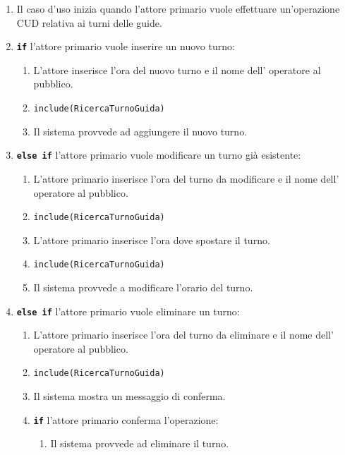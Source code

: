 \documentclass{article}
\begin{document}
		\begin{enumerate}[itemsep=8pt,parsep=0pt]
		
		\item 
		Il caso d'uso inizia quando l'attore primario vuole effettuare un’operazione CUD relativa ai turni delle guide.


		\item \texttt{\textbf{if}} l'attore primario vuole inserire un nuovo turno:
			\begin{enumerate}	[leftmargin=28pt]
			    \item L'attore inserisce l'ora del nuovo turno e il nome dell' operatore al pubblico.
				\item \texttt{{include(RicercaTurnoGuida)}}
				\item  Il sistema provvede ad aggiungere il nuovo turno.
  			\end{enumerate}	


		\item \texttt{\textbf{else if}} l’attore primario vuole modificare un turno già esistente:
			\begin{enumerate}[leftmargin=28pt]
			    \item L'attore primario inserisce l'ora del turno da modificare e il nome dell' operatore al pubblico.
				\item  \texttt{{include(RicercaTurnoGuida)}}
				\item L'attore primario inserisce l'ora dove spostare il turno.
				\item  \texttt{{include(RicercaTurnoGuida)}}
				\item  Il sistema provvede a modificare l'orario del turno.
  			\end{enumerate}	
  			
  		\item \texttt{\textbf{else if}} l'attore primario vuole eliminare un turno:
			\begin{enumerate}	[leftmargin=28pt]
			\item L'attore primario inserisce l'ora del turno da eliminare e il nome dell' operatore al pubblico.
			\item \texttt{{include(RicercaTurnoGuida)}}
			\item  Il sistema mostra un messaggio di conferma.
			\item \texttt{\textbf{if}}  l'attore primario conferma l'operazione:
			\begin{enumerate}	[leftmargin=28pt]
				\item  Il sistema provvede ad eliminare il turno.
			\end{enumerate}
  		\end{enumerate}		
  			

	\end{enumerate}
	
\end{document}
